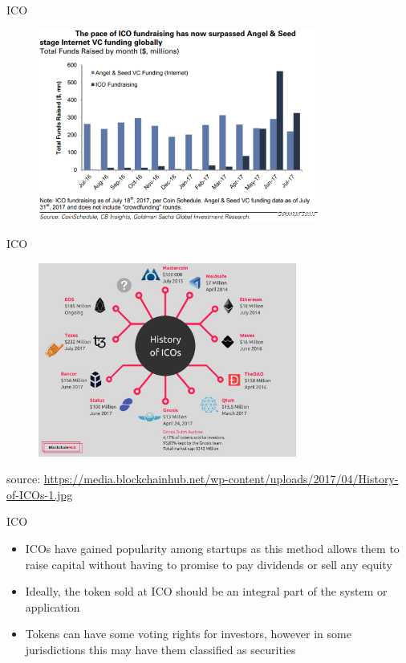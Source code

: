 \documentclass[9pt]{beamer}
\begin{document}

\begin{frame}{ICO}
	\begin{figure}[]
		\centering
		\includegraphics  [width=93mm]{Images/ico2}
	\end{figure}
\end{frame}


\begin{frame}{ICO}
	\begin{figure}[]
		\centering
		\includegraphics  [width=85mm]{Images/ico1}
	\end{figure}
	\begin{scriptsize}
		source: \href{https://blockchainhub.net/ico-initial-coin-offerings/}{https://media.blockchainhub.net/wp-content/uploads/2017/04/History-of-ICOs-1.jpg}
	\end{scriptsize}
\end{frame}


\begin{frame}{ICO}
	\begin{itemize}
		\item ICOs have gained popularity among startups as this method allows them to raise capital without having to promise to pay dividends or sell any equity
		\item Ideally, the token sold at ICO should be an integral part of the system or application
		\item Tokens can have some voting rights for investors, however in some jurisdictions this may have them classified as securities
	\end{itemize}
\end{frame}
\end{document}
